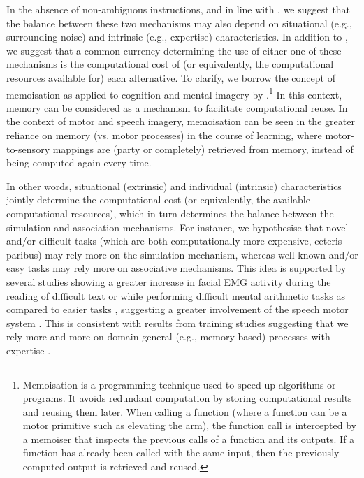 \documentclass[utf8]{template/frontiersSCNS} %
\begin{document}
In the absence of non-ambiguous instructions, and in line with \cite{tian_mental_2012}, we suggest that the balance between these two mechanisms may also depend on situational (e.g., surrounding noise) and intrinsic (e.g., expertise) characteristics. In addition to \cite{tian_mental_2012}, we suggest that a common currency determining the use of either one of these mechanisms is the computational cost of (or equivalently, the computational resources available for) each alternative. To clarify, we borrow the concept of memoisation as applied to cognition and mental imagery by \cite{dasgupta_memory_2021}.\footnote{Memoisation is a programming technique used to speed-up algorithms or programs. It avoids redundant computation by storing computational results and reusing them later. When calling a function (where a function can be a motor primitive such as elevating the arm), the function call is intercepted by a memoiser that inspects the previous calls of a function and its outputs. If a function has already been called with the same input, then the previously computed output is retrieved and reused.} In this context, memory can be considered as a mechanism to facilitate computational reuse. In the context of motor and speech imagery, memoisation can be seen in the greater reliance on memory (vs. motor processes) in the course of learning, where motor-to-sensory mappings are (party or completely) retrieved from memory, instead of being computed again every time.

In other words, situational (extrinsic) and individual (intrinsic) characteristics jointly determine the computational cost (or equivalently, the available computational resources), which in turn determines the balance between the simulation and association mechanisms. For instance, we hypothesise that novel and/or difficult tasks (which are both computationally more expensive, ceteris paribus) may rely more on the simulation mechanism, whereas well known and/or easy tasks may rely more on associative mechanisms. This idea is supported by several studies showing a greater increase in facial EMG activity during the reading of difficult text or while performing difficult mental arithmetic tasks as compared to easier tasks \citep[e.g.,][]{faaborg-andersen_electromyography_1958, sokolov_inner_1972}, suggesting a greater involvement of the speech motor system \citep[and/or a lesser involvement of inhibitory mechanisms, see also the discussion in][]{nalborczyk_understanding_2019-1, nalborczyk_re-analysing_2020}. This is consistent with results from training studies suggesting that we rely more and more on domain-general (e.g., memory-based) processes with expertise \citep[e.g.,][]{tarr_mental_1989, jolicoeur_time_1985}.
\end{document}
